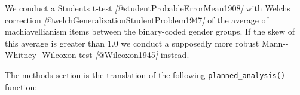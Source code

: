 \documentclass[psych,tutorial,accept,moreauthors,pdftex]{Definitions/mdpi}
\newenvironment{Shaded}{\begin{snugshade}}{\end{snugshade}}
\newcommand{\CommentTok}[1]{\textcolor[rgb]{0.56,0.35,0.01}{\textit{#1}}}
\newcommand{\NormalTok}[1]{#1}
\newcommand{\OtherTok}[1]{\textcolor[rgb]{0.56,0.35,0.01}{#1}}
\begin{document}
\nointerlineskip
\begin{adjustwidth}{0.5cm}{0cm} 
\begin{Shaded}
\begin{Highlighting}[]
\NormalTok{We conduct a Student\textquotesingle{}s t{-}test }\CommentTok{[}\OtherTok{@studentProbableErrorMean1908}\CommentTok{]}\NormalTok{ with Welch\textquotesingle{}s}
\NormalTok{correction }\CommentTok{[}\OtherTok{@welchGeneralizationStudentProblem1947}\CommentTok{]}\NormalTok{ of the average of}
\NormalTok{machiavellianism items between the binary{-}coded gender groups. If the skew of}
\NormalTok{this average is greater than 1.0 we conduct a supposedly more robust Mann{-}{-}}
\NormalTok{Whitney{-}{-}Wilcoxon test }\CommentTok{[}\OtherTok{@Wilcoxon1945}\CommentTok{]}\NormalTok{ instead.}
\end{Highlighting}
\end{Shaded}
\end{adjustwidth}
\begin{paracol}{2}
\switchcolumn


The methods section is the translation of the following
\texttt{planned\_analysis()} function:

\newpage
\end{paracol}
\nointerlineskip
\end{document}
